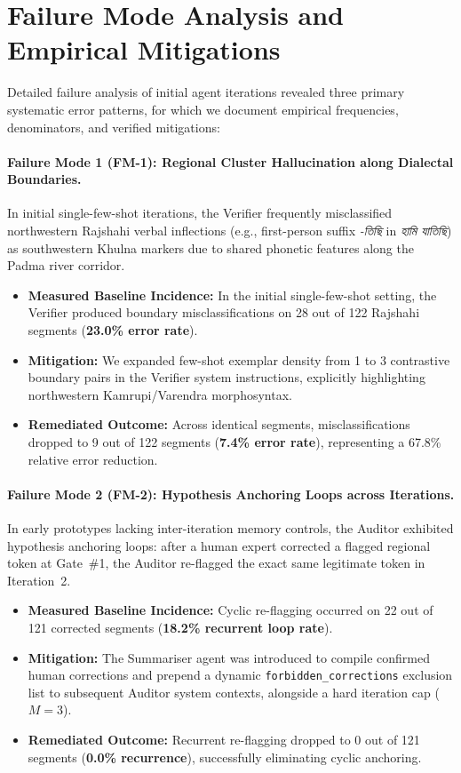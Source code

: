 \section{Failure Mode Analysis and Empirical Mitigations}
\label{sec:failure_modes}

Detailed failure analysis of initial agent iterations revealed three primary systematic error patterns, for which we document empirical frequencies, denominators, and verified mitigations:

\paragraph{Failure Mode 1 (FM-1): Regional Cluster Hallucination along Dialectal Boundaries.}
In initial single-few-shot iterations, the Verifier frequently misclassified northwestern Rajshahi verbal inflections (e.g., first-person suffix \textit{-তিছি} in \textit{হামি যাতিছি}) as southwestern Khulna markers due to shared phonetic features along the Padma river corridor.
\begin{itemize}
    \item \textbf{Measured Baseline Incidence:} In the initial single-few-shot setting, the Verifier produced boundary misclassifications on 28 out of 122 Rajshahi segments (\textbf{23.0\% error rate}).
    \item \textbf{Mitigation:} We expanded few-shot exemplar density from 1 to 3 contrastive boundary pairs in the Verifier system instructions, explicitly highlighting northwestern Kamrupi/Varendra morphosyntax.
    \item \textbf{Remediated Outcome:} Across identical segments, misclassifications dropped to 9 out of 122 segments (\textbf{7.4\% error rate}), representing a 67.8\% relative error reduction.
\end{itemize}

\paragraph{Failure Mode 2 (FM-2): Hypothesis Anchoring Loops across Iterations.}
In early prototypes lacking inter-iteration memory controls, the Auditor exhibited hypothesis anchoring loops: after a human expert corrected a flagged regional token at Gate~\#1, the Auditor re-flagged the exact same legitimate token in Iteration~2.
\begin{itemize}
    \item \textbf{Measured Baseline Incidence:} Cyclic re-flagging occurred on 22 out of 121 corrected segments (\textbf{18.2\% recurrent loop rate}).
    \item \textbf{Mitigation:} The Summariser agent was introduced to compile confirmed human corrections and prepend a dynamic \texttt{forbidden\_corrections} exclusion list to subsequent Auditor system contexts, alongside a hard iteration cap ($M=3$).
    \item \textbf{Remediated Outcome:} Recurrent re-flagging dropped to 0 out of 121 segments (\textbf{0.0\% recurrence}), successfully eliminating cyclic anchoring.
\end{itemize}

